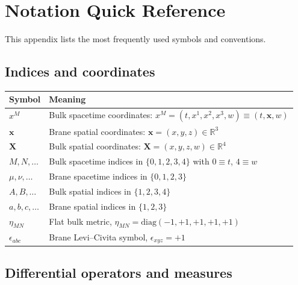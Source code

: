 \documentclass[11pt]{article}
\begin{document}
\section{Notation Quick Reference}
\label{app:notation}

This appendix lists the most frequently used symbols and conventions.

\subsection*{Indices and coordinates}

\begin{center}
\begin{tabular}{@{}ll@{}}
\toprule
Symbol & Meaning \\
\midrule
$x^M$ & Bulk spacetime coordinates: $x^M=(t,x^1,x^2,x^3,w)\equiv (t,\mathbf{x},w)$ \\
$\mathbf{x}$ & Brane spatial coordinates: $\mathbf{x}=(x,y,z)\in\mathbb{R}^3$ \\
$\mathbf{X}$ & Bulk spatial coordinates: $\mathbf{X}=(x,y,z,w)\in\mathbb{R}^4$ \\
$M,N,\ldots$ & Bulk spacetime indices in $\{0,1,2,3,4\}$ with $0\equiv t$, $4\equiv w$ \\
$\mu,\nu,\ldots$ & Brane spacetime indices in $\{0,1,2,3\}$ \\
$A,B,\ldots$ & Bulk spatial indices in $\{1,2,3,4\}$ \\
$a,b,c,\ldots$ & Brane spatial indices in $\{1,2,3\}$ \\
$\eta_{MN}$ & Flat bulk metric, $\eta_{MN}=\mathrm{diag}(-1,+1,+1,+1,+1)$ \\
$\epsilon_{abc}$ & Brane Levi--Civita symbol, $\epsilon_{xyz}=+1$ \\
\bottomrule
\end{tabular}
\end{center}

\subsection*{Differential operators and measures}
\end{document}
